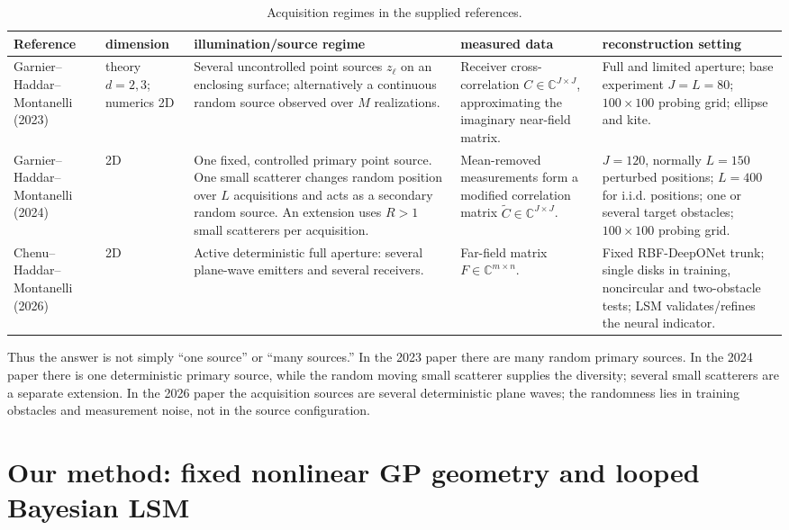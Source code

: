 \documentclass[10pt]{article}
\newcommand{\C}{\mathbb C}
\begin{document}
\begin{table}[H]
\centering
\small
\caption{Acquisition regimes in the supplied references.}
\begin{tabularx}{\linewidth}{@{}p{2.15cm}p{1.25cm}YYY@{}}
\toprule
Reference & dimension & illumination/source regime & measured data & reconstruction setting \\
\midrule
Garnier--Haddar--Montanelli (2023)
& theory $d=2,3$; numerics 2D
& Several uncontrolled point sources $z_\ell$ on an enclosing surface; alternatively a continuous random source observed over $M$ realizations.
& Receiver cross-correlation $C\in\C^{J\times J}$, approximating the imaginary near-field matrix.
& Full and limited aperture; base experiment $J=L=80$; $100\times100$ probing grid; ellipse and kite. \\
\addlinespace
Garnier--Haddar--Montanelli (2024)
& 2D
& One fixed, controlled primary point source.  One small scatterer changes random position over $L$ acquisitions and acts as a secondary random source.  An extension uses $R>1$ small scatterers per acquisition.
& Mean-removed measurements form a modified correlation matrix $\widetilde C\in\C^{J\times J}$.
& $J=120$, normally $L=150$ perturbed positions; $L=400$ for i.i.d. positions; one or several target obstacles; $100\times100$ probing grid. \\
\addlinespace
Chenu--Haddar--Montanelli (2026)
& 2D
& Active deterministic full aperture: several plane-wave emitters and several receivers.
& Far-field matrix $F\in\C^{m\times n}$.
& Fixed RBF-DeepONet trunk; single disks in training, noncircular and two-obstacle tests; LSM validates/refines the neural indicator. \\
\bottomrule
\end{tabularx}
\end{table}

Thus the answer is not simply ``one source'' or ``many sources.''  In the 2023
paper there are many random primary sources.  In the 2024 paper there is one
deterministic primary source, while the random moving small scatterer supplies
the diversity; several small scatterers are a separate extension.  In the 2026
paper the acquisition sources are several deterministic plane waves; the
randomness lies in training obstacles and measurement noise, not in the source
configuration.

\section{Our method: fixed nonlinear GP geometry and looped Bayesian LSM}
\end{document}
